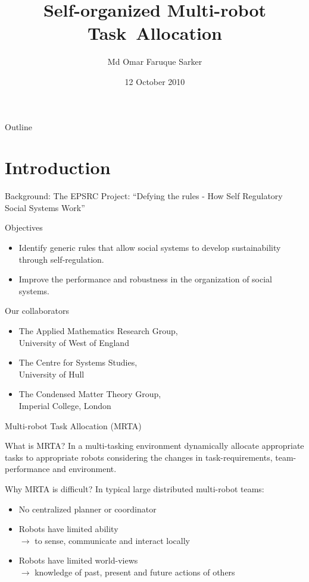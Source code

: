 \documentclass{beamer}
\title[Self-organized Multi-robot Task~Allocation] 
{%
  Self-organized Multi-robot Task~Allocation%
}
\author[MOFSarker]
{
  Md Omar Faruque Sarker
}
\institute[UWN]
{
 PhD Student\\
 Cognitive Robotics Research Centre\\
 Newport Business School\\
 University of Wales, Newport
}
\date{12 October 2010}
\begin{document}
\begin{frame}
  \titlepage
\end{frame}

\begin{frame}{Outline}
  \tableofcontents
\end{frame}
\section{Introduction}
\begin{frame}[t]{Background: The EPSRC Project: ``Defying the rules - How Self Regulatory Social Systems Work''}
\begin{block}{Objectives}
\begin{itemize}
\item \alert{Identify generic rules} that allow social systems to develop sustainability through \alert{self-regulation}.
\item Improve the \alert{performance} and \alert{robustness} in the organization of social systems. 
\end{itemize}
\end{block}
\begin{block}{Our collaborators}
\begin{itemize}
\item The Applied Mathematics Research Group,\\ \alert{University of West of England}
\item The Centre for Systems Studies,\\ \alert{University of Hull}
\item The Condensed Matter Theory Group,\\ \alert{ Imperial College, London}
\end{itemize}
\end{block}
\end{frame}
\begin{frame}[t]{Multi-robot Task Allocation (MRTA)}
	
\begin{block}{What is MRTA?}
In a multi-tasking environment dynamically allocate appropriate tasks to appropriate robots considering the  changes in \alert{task-requirements, team-performance and environment.}
\end{block}
  	
\begin{block}{Why MRTA is difficult?}
In typical large distributed multi-robot teams:
\begin{itemize}
\item No centralized planner or coordinator
\item \alert{Robots have limited ability}\\
$\rightarrow$ \small to sense, communicate and interact locally
\item \normalsize \alert{Robots have limited world-views}\\ 
$\rightarrow$ \small knowledge of past, present and future actions of others
\end{itemize}
\end{block}
  	
\end{frame}
\end{document}
